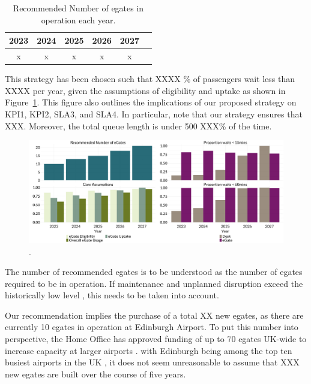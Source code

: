 \documentclass[10pt]{article}
\begin{document}
\begin{table}[!htp]
    \centering
    \begin{tabular}{cccccc}
         2023 & 2024 & 2025 & 2026 & 2027  \\ \hline
          x & x & x & x & x
    \end{tabular}
    \caption{Recommended Number of \glspl{egate} in operation each year.}
    \label{tab:recommendation}
\end{table}

This strategy has been chosen such that XXXX \% of passengers wait less than XXXX per year, given the assumptions of eligibility and uptake as shown in Figure~\ref{fig:recommendation}. This figure also outlines the implications of our proposed strategy on KPI1, KPI2, SLA3, and SLA4. In particular, note that our strategy ensures that XXX. Moreover, the total queue length is under 500 XXX\% of the time.

\begin{figure}[!ht]
    \centering
    \includegraphics[width=\textwidth]{figures/prototype_rec_fig.png}
     \caption{.} \label{fig:recommendation}
\end{figure}

The number of recommended \glspl{egate} is to be understood as the number of \glspl{egate} required to be in operation. If maintenance and unplanned disruption exceed the historically low level \cite{Inspection_eGates}, this needs to be taken into account. 

Our recommendation implies the purchase of a total XX new \glspl{egate}, as there are currently 10 \glspl{egate} in operation at Edinburgh Airport. To put this number into perspective, the Home Office has approved funding of up to 70 \glspl{egate} UK-wide to increase capacity at larger airports \cite{Inspection_eGates}. with Edinburgh being among the top ten busiest airports in the UK \cite{busiestairport}, it does not seem unreasonable to assume that XXX new \glspl{egate} are built over the course of five years. 
\end{document}
